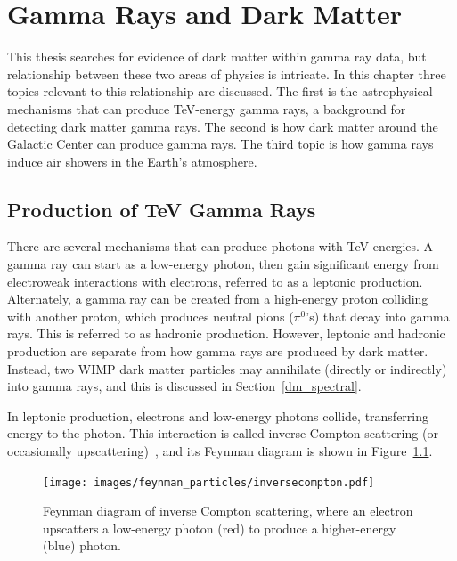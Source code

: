 \cleartooddpage[\thispagestyle{empty}]

\newcommand{\Lim}[1]{\raisebox{0.5ex}{\scalebox{0.8}{$\displaystyle \lim_{#1}\;$}}}
\renewcommand{\labelitemi}{\textbullet}
\newcommand{\pip}[1]{$\pi^{+}$}
\newcommand{\pim}[1]{$\pi^{-}$}
\newcommand{\pio}[1]{$\pi^{0}$}
\newcommand{\sv}{\left < \sigma v \right >}

\chapter{Gamma Rays and Dark Matter}\label{ch_gamma}


This thesis searches for evidence of dark matter within gamma ray data, but relationship between these two areas of physics is intricate.
In this chapter three topics relevant to this relationship are discussed.
The first is the astrophysical mechanisms that can produce TeV-energy gamma rays, a background for detecting dark matter gamma rays.
The second is how dark matter around the Galactic Center can produce gamma rays.
The third topic is how gamma rays induce air showers in the Earth's atmosphere.

\section{Production of TeV Gamma Rays}

  There are several mechanisms that can produce photons with TeV energies.
  A gamma ray can start as a low-energy photon, then gain significant energy from electroweak interactions with electrons, referred to as a leptonic production.
  Alternately, a gamma ray can be created from a high-energy proton colliding with another proton, which produces neutral pions ($\pi^0$'s) that decay into gamma rays.
  This is referred to as hadronic production.
  However, leptonic and hadronic production are separate from how gamma rays are produced by dark matter.
  Instead, two WIMP dark matter particles may annihilate (directly or indirectly) into gamma rays, and this is discussed in Section~\ref{dm_spectral}.

  In leptonic production, electrons and low-energy photons collide, transferring energy to the photon.
  This interaction is called inverse Compton scattering (or occasionally upscattering)~\cite{compton_effect}, and its Feynman diagram is shown in Figure~\ref{fig:inv_compt_feyn}.
  
  \begin{figure}[!ht]
    \centering
    \texttt{[image: images/feynman\_particles/inversecompton.pdf]}
    \caption[Inverse Compton Scattering Feynman Diagram]{
      Feynman diagram of inverse Compton scattering, where an electron upscatters a low-energy photon (red) to produce a higher-energy (blue) photon.
    }
    \label{fig:inv_compt_feyn}
  \end{figure}
  \FloatBarrier
  
